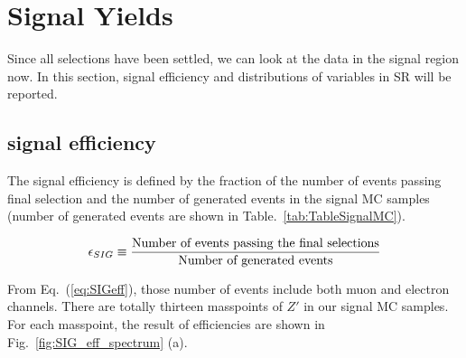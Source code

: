 \section{Signal Yields}
Since all selections have been settled, we can look at the data in the signal region now. In this section, signal efficiency and distributions of variables in SR will be reported. 

\subsection{signal efficiency}
The signal efficiency is defined by the fraction of the number of events passing final selection and the number of generated events in the signal MC samples (number of generated events are shown in Table.~\ref{tab:TableSignalMC}). 

\begin{align}
  \label{eq:SIGeff}
  \epsilon_{SIG}\equiv \frac{\textup{Number of events passing the final selections}}{\textup{Number of generated events}}
\end{align}

From Eq.~(\ref{eq:SIGeff}), those number of events include both muon and electron channels. There are totally thirteen masspoints of $Z'$ in our signal MC samples. For each masspoint, the result of efficiencies are shown in Fig.~\ref{fig:SIG_eff_spectrum} (a).

